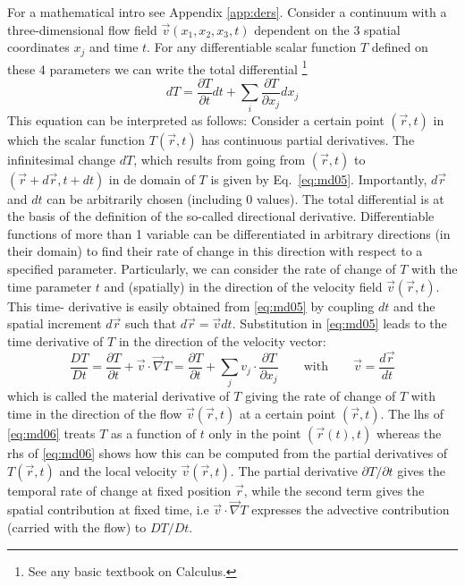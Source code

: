 For a mathematical intro see Appendix \ref{app:ders}.
Consider a continuum with a three-dimensional flow 
field $\vec{v}(x_1,x_2,x_3,t)$ dependent on
the 3 spatial coordinates $x_j$ and time $t$. 
For any differentiable scalar function $T$ defined on
these 4 parameters we can write the total differential
\footnote{See any basic textbook on Calculus.}
\begin{equation}
dT = \frac{\partial T}{\partial t} dt + 
\sum_i \frac{\partial T}{\partial x_j} dx_j
\label{eq:md05}
\end{equation}
This equation can be interpreted as follows: 
Consider a certain point $(\vec{r}, t)$ in which the
scalar function $T(\vec{r}, t)$ has continuous partial 
derivatives. The infinitesimal change $dT$,
which results from going 
from $(\vec{r}, t)$ to 
$(\vec{r} + d\vec{r}, t + dt)$ in de domain of $T$ 
is given by Eq.~\eqref{eq:md05}. 
Importantly, $d\vec{r}$ and $dt$ can be arbitrarily 
chosen (including 0 values). The total
differential is at the basis of the definition of 
the so-called directional derivative.
Differentiable functions of more than 1 variable 
can be differentiated in arbitrary
directions (in their domain) to find their rate of change 
in this direction with respect to a
specified parameter. Particularly, we can consider the 
rate of change of $T$ with the time
parameter $t$ and (spatially) in the direction of 
the velocity field $\vec{v}(\vec{r}, t)$. This time-
derivative is easily obtained from \eqref{eq:md05}
by coupling $dt$ and the spatial increment $d\vec{r}$ such
that $d\vec{r} = \vec{v}dt$. 
Substitution in \eqref{eq:md05} leads to the time 
derivative of $T$ in the direction of the
velocity vector:
\begin{equation}
\frac{DT}{Dt} = 
\frac{\partial T}{\partial t} 
+\vec{v} \cdot \vec\nabla T
=
\frac{\partial T}{\partial t} 
+\sum_j v_j \cdot \frac{\partial T}{\partial x_j} 
\qquad
\text{with}
\qquad
\vec{v} =\frac{d \vec{r}}{dt}
\label{eq:md06}
\end{equation}
which is called the material derivative of $T$ 
giving the rate of change of $T$ with time in
the direction of the flow $\vec{v}(\vec{r},t)$ 
at a certain point $(\vec{r}, t)$. 
The lhs of \eqref{eq:md06} treats $T$ as a
function of $t$ only in the point $(\vec{r}(t), t)$ 
whereas the rhs of \eqref{eq:md06} shows how this can be
computed from the partial derivatives of $T(\vec{r}, t)$
and the local velocity $\vec{v}(\vec{r}, t)$. The partial
derivative $\partial T/\partial t$
gives the temporal rate of change at fixed position 
$\vec{r}$, while the second term
gives the spatial contribution at fixed time, i.e
$\vec{v} \cdot \vec\nabla T$
expresses the advective contribution
(carried with the flow) to $DT/Dt$.

